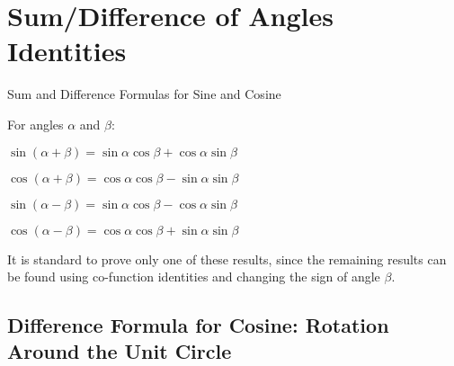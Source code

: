 \section{Sum/Difference of Angles Identities}

\begin{thm}{Sum and Difference Formulas for Sine and Cosine}
  \hspace{1cm}

For angles $\alpha$ and $\beta$:

\begin{multicols}{2}
  $\sin(\alpha + \beta) = \sin\alpha\cos\beta + \cos\alpha\sin\beta$

  $\cos(\alpha + \beta) = \cos\alpha\cos\beta - \sin\alpha\sin\beta$

  $\sin(\alpha - \beta) = \sin\alpha\cos\beta - \cos\alpha\sin\beta$

  $\cos(\alpha - \beta) = \cos\alpha\cos\beta + \sin\alpha\sin\beta$
\end{multicols}
\end{thm}

It is standard to prove only one of these results, since the remaining results can be found using co-function identities and changing the sign of angle $\beta$.

\subsection{Difference Formula for Cosine: Rotation Around the Unit Circle}

